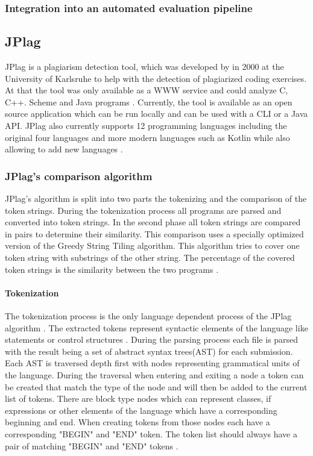 \documentclass[a4paper, 11pt]{article}
\renewcommand{\\}{\vspace*{0.5\baselineskip} \newline}
\begin{document}
\subsubsection{Integration into an automated evaluation pipeline}

\newpage

\subsection{JPlag}

JPlag is a plagiarism detection tool, which was developed by in 2000 at the University of Karlsruhe to help with the detection of plagiarized coding
exercises. At that the tool was only available as a WWW service and could analyze C, C++. Scheme and Java programs \autocite[p. 4]{JPlagP}. Currently, the tool is available
as an open source application which can be run locally and can be used with a CLI or a Java API. JPlag also currently supports 12 programming languages
including the original four languages and more modern languages such as Kotlin \autocite[Supported Languages
]{JPlagG} while also allowing to add new languages \autocite{JPlagW4}.

\subsubsection{JPlag's comparison algorithm}

JPlag's algorithm is split into two parts the tokenizing and the comparison of the token strings. During the tokenization
process all programs are parsed and converted into token strings. In the second phase all token strings are compared
in pairs to determine their similarity. This comparison uses a specially optimized version of the Greedy String Tiling
algorithm. This algorithm tries to cover one token string with substrings of the other string. The percentage of the covered token 
strings is the similarity between the two programs \autocite[p. 10]{JPlagP}.

\paragraph{Tokenization}

The tokenization process is the only language dependent process of the JPlag algorithm \autocite[p. 10]{JPlagP}. The extracted tokens
represent syntactic elements of the language like statements or control structures \autocite[How are submissions represented? — Notion of Token]{JPlagW4}.
During the parsing process each file is parsed with the result being a set of abstract syntax trees(AST) for each submission. Each AST
is traversed depth first with nodes representing grammatical units of the language. During the traversal when entering and exiting a 
node a token can be created that match the type of the node and will then be added to the current list of tokens. There are block type
nodes which can represent classes, if expressions or other elements of the language which have a corresponding beginning and end. When
creating tokens from those nodes each have a corresponding "BEGIN" and "END" token. The token list should always have a pair of matching
"BEGIN" and "END" tokens \autocite[How does the transformation work?]{JPlagW4}.
\end{document}
